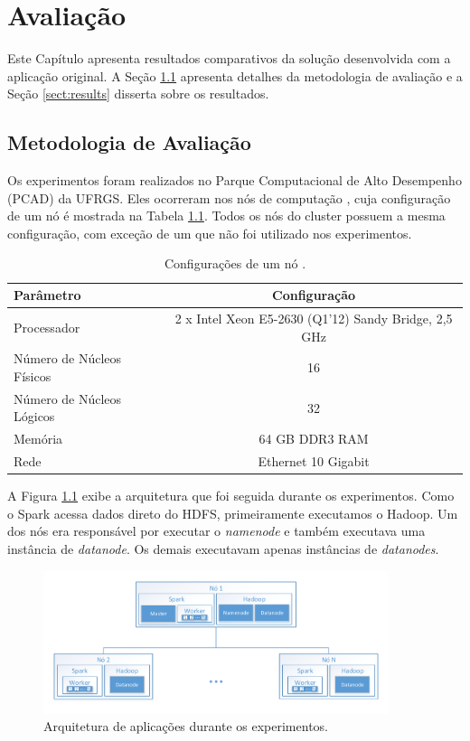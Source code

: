 \chapter{Avaliação} \label{ch:evaluation}

Este Capítulo apresenta resultados comparativos da solução desenvolvida com a 
aplicação original. A Seção \ref{sect:methodology} apresenta detalhes da 
metodologia de avaliação e a Seção \ref{sect:results} disserta sobre os 
resultados.


\section{Metodologia de Avaliação} \label{sect:methodology}

Os experimentos foram realizados no Parque Computacional de Alto Desempenho 
(PCAD) da UFRGS. Eles ocorreram nos nós de computação , cuja 
configuração de um nó é mostrada na Tabela \ref{tab:draco_config}. Todos os nós 
do cluster possuem a mesma configuração, com exceção de um que não foi 
utilizado nos experimentos.

\begin{table}[H]
\centering
\small
\begin{tabular}{l c} \toprule
\textbf{Parâmetro}  &  \textbf{Configuração} \\ 
\midrule
Processador     & 2 x Intel Xeon E5-2630 (Q1'12) Sandy Bridge, 2,5 GHz  
\\
Número de Núcleos Físicos    & 16  \\
Número de Núcleos Lógicos   & 32   \\
Memória       & 64 GB DDR3 RAM   \\
Rede	      & Ethernet 10 Gigabit \\
\end{tabular}
\caption{Configurações de um nó .}
\label{tab:draco_config}
\end{table}


A Figura \ref{fig:experiment_arch} exibe a arquitetura que foi seguida durante 
os experimentos. Como o Spark acessa dados direto do HDFS, primeiramente 
executamos o Hadoop. Um dos nós era responsável por executar o \emph{namenode} e 
também executava uma instância de \emph{datanode}. Os demais executavam apenas 
instâncias de \emph{datanodes}.


\begin{figure}[ht]
\centerline{
\includegraphics[width=0.9\textwidth]{./img/experiments_arch.pdf}}
 \caption{Arquitetura de aplicações durante os experimentos.}
 \label{fig:experiment_arch}
\end{figure}



